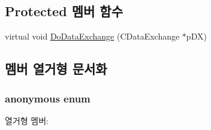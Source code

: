 \subsection*{Protected 멤버 함수}
\begin{DoxyCompactItemize}
\item 
virtual void \hyperlink{class_c_binth_set_ae150a279770f1fe4f597b73c07e887ba}{Do\-Data\-Exchange} (C\-Data\-Exchange $\ast$p\-D\-X)
\end{DoxyCompactItemize}


\subsection{멤버 열거형 문서화}
\hypertarget{class_c_binth_set_aca68a0fab0b7b10ebe4fd14a8a6c8c54}{\subsubsection[{anonymous enum}]{\setlength{\rightskip}{0pt plus 5cm}anonymous enum}}\label{class_c_binth_set_aca68a0fab0b7b10ebe4fd14a8a6c8c54}
\begin{Desc}
\item[열거형 멤버\-: ]\par
\begin{description}
\item[{\em 
\hypertarget{class_c_binth_set_aca68a0fab0b7b10ebe4fd14a8a6c8c54a9d704acbd71024f8a51ae396d202392d}{I\-D\-D}\label{class_c_binth_set_aca68a0fab0b7b10ebe4fd14a8a6c8c54a9d704acbd71024f8a51ae396d202392d}
}]\end{description}
\end{Desc}



